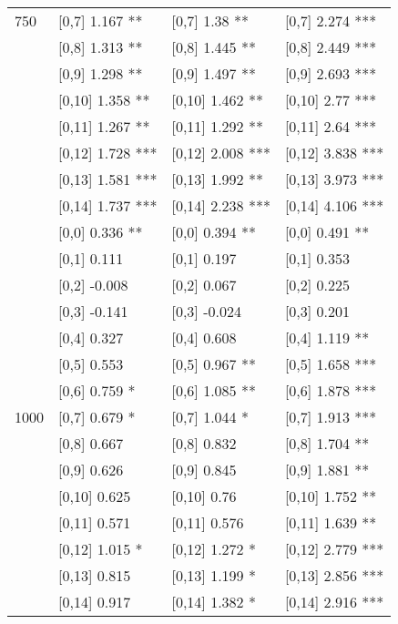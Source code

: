 \begin{table}
\begin{tabular}[t]{llll}
750 & {}[0,7] 1.167 ** & {}[0,7] 1.38 ** & {}[0,7] 2.274 ***\\
 & {}[0,8] 1.313 ** & {}[0,8] 1.445 ** & {}[0,8] 2.449 ***\\
 & {}[0,9] 1.298 ** & {}[0,9] 1.497 ** & {}[0,9] 2.693 ***\\
\addlinespace
 & {}[0,10] 1.358 ** & {}[0,10] 1.462 ** & {}[0,10] 2.77 ***\\
 & {}[0,11] 1.267 ** & {}[0,11] 1.292 ** & {}[0,11] 2.64 ***\\
 & {}[0,12] 1.728 *** & {}[0,12] 2.008 *** & {}[0,12] 3.838 ***\\
 & {}[0,13] 1.581 *** & {}[0,13] 1.992 ** & {}[0,13] 3.973 ***\\
 & {}[0,14] 1.737 *** & {}[0,14] 2.238 *** & {}[0,14] 4.106 ***\\
\addlinespace
 & {}[0,0] 0.336 ** & {}[0,0] 0.394 ** & {}[0,0] 0.491 **\\
 & {}[0,1] 0.111 & {}[0,1] 0.197 & {}[0,1] 0.353\\
 & {}[0,2] -0.008 & {}[0,2] 0.067 & {}[0,2] 0.225\\
 & {}[0,3] -0.141 & {}[0,3] -0.024 & {}[0,3] 0.201\\
 & {}[0,4] 0.327 & {}[0,4] 0.608 & {}[0,4] 1.119 **\\
\addlinespace
 & {}[0,5] 0.553 & {}[0,5] 0.967 ** & {}[0,5] 1.658 ***\\
 & {}[0,6] 0.759 * & {}[0,6] 1.085 ** & {}[0,6] 1.878 ***\\
1000 & {}[0,7] 0.679 * & {}[0,7] 1.044 * & {}[0,7] 1.913 ***\\
 & {}[0,8] 0.667 & {}[0,8] 0.832 & {}[0,8] 1.704 **\\
 & {}[0,9] 0.626 & {}[0,9] 0.845 & {}[0,9] 1.881 **\\
\addlinespace
 & {}[0,10] 0.625 & {}[0,10] 0.76 & {}[0,10] 1.752 **\\
 & {}[0,11] 0.571 & {}[0,11] 0.576 & {}[0,11] 1.639 **\\
 & {}[0,12] 1.015 * & {}[0,12] 1.272 * & {}[0,12] 2.779 ***\\
 & {}[0,13] 0.815 & {}[0,13] 1.199 * & {}[0,13] 2.856 ***\\
 & {}[0,14] 0.917 & {}[0,14] 1.382 * & {}[0,14] 2.916 ***\\
\bottomrule
\end{tabular}
\end{table}
